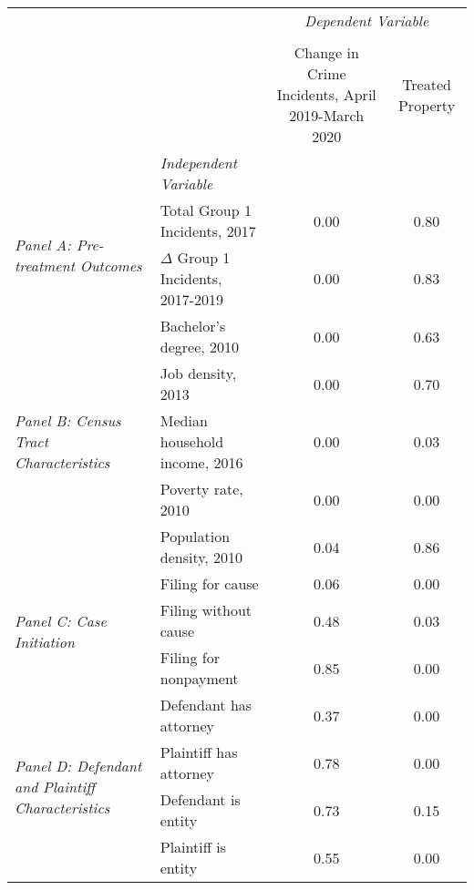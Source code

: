 \begin{tabular}{llcc}
\toprule
 &  & \multicolumn{2}{c}{\textit{Dependent Variable}} \\
\cline{3-4}
\\
 &  & Change in Crime Incidents, April 2019-March 2020 & Treated Property \\
 & \emph{Independent Variable} &  &  \\
\midrule
\multirow[c]{2}{3cm}{\textit{Panel A: Pre-treatment Outcomes}} & Total Group 1 Incidents, 2017 & 0.00 & 0.80 \\
 & $\Delta$ Group 1 Incidents, 2017-2019 & 0.00 & 0.83 \\
\cline{1-4}
\multirow[c]{5}{3cm}{\textit{Panel B: Census Tract Characteristics}} & Bachelor's degree, 2010 & 0.00 & 0.63 \\
 & Job density, 2013 & 0.00 & 0.70 \\
 & Median household income, 2016 & 0.00 & 0.03 \\
 & Poverty rate, 2010 & 0.00 & 0.00 \\
 & Population density, 2010 & 0.04 & 0.86 \\
\cline{1-4}
\multirow[c]{3}{3cm}{\textit{Panel C: Case Initiation}} & Filing for cause & 0.06 & 0.00 \\
 & Filing without cause & 0.48 & 0.03 \\
 & Filing for nonpayment & 0.85 & 0.00 \\
\cline{1-4}
\multirow[c]{4}{3cm}{\textit{Panel D: Defendant and Plaintiff Characteristics}} & Defendant has attorney & 0.37 & 0.00 \\
 & Plaintiff has attorney & 0.78 & 0.00 \\
 & Defendant is entity & 0.73 & 0.15 \\
 & Plaintiff is entity & 0.55 & 0.00 \\
\cline{1-4}
\bottomrule
\end{tabular}
